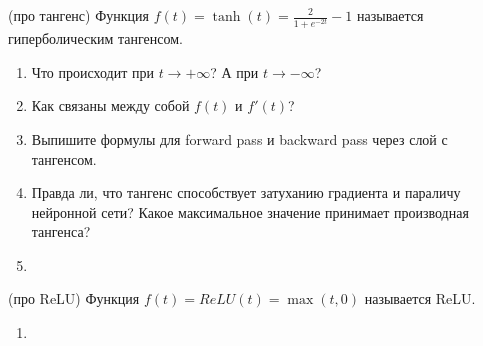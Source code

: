 \begin{problem}{(про тангенс)}
	Функция $f(t) = \tanh(t) = \frac{2}{1 + e^{-2t}} - 1$ называется гиперболическим тангенсом.
	\begin{enumerate}
		\item Что происходит при $t \to +\infty$? А при $t \to -\infty$?
		\item Как связаны между собой $f(t)$ и  $f'(t)$?
		\item Выпишите формулы для forward pass и backward pass через слой с тангенсом. 
		\item Правда ли, что тангенс способствует затуханию градиента и параличу нейронной сети? Какое максимальное значение принимает производная тангенса? 
		\item {}
	\end{enumerate}
\end{problem} 

\begin{problem}{(про ReLU)}
	Функция $f(t) = ReLU(t) = \max(t, 0)$ называется ReLU.
	\begin{enumerate}
        \item 
	\end{enumerate}
\end{problem} 




